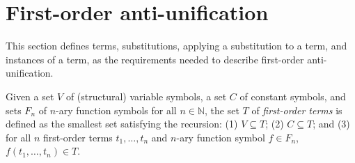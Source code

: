 \section{First-order anti-unification}   \label{AU}

This section defines terms, substitutions, applying a substitution to a term, and instances of a term, as the requirements needed to describe first-order anti-unification.

\begin{defn}\label{def:term}
Given a set $V$ of (structural) variable symbols, a set $C$ of constant symbols, and sets $F_n$ of $n$-ary function symbols for all $n\in\mathbb{N}$, the set $T$ of \emph{first-order terms} is defined as the smallest set satisfying the recursion: (1) $V\subseteq T$; (2) $C\subseteq T$; and (3) for all $n$ first-order terms $t_1, \ldots, t_n$ and $n$-ary function symbol $f\in F_n$,  $f(t_1, \ldots, t_n) \in T$.
\end{defn}

